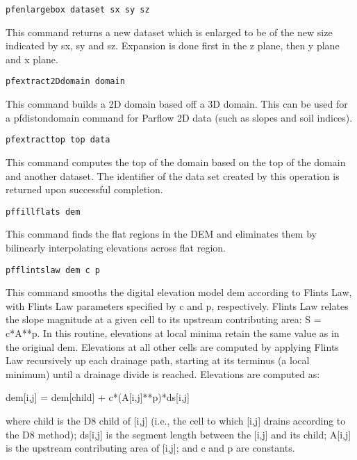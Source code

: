 \begin{description}
\item{\begin{verbatim}pfenlargebox dataset sx sy sz\end{verbatim}}
This command returns a new dataset which is enlarged to be of the
new size indicated by sx, sy and sz. Expansion is done first in the
z plane, then y plane and x plane.

\item{\begin{verbatim}pfextract2Ddomain domain\end{verbatim}} This
 command builds a 2D domain based off a 3D domain.  This can be used
 for a pfdistondomain command for Parflow 2D data (such as slopes and
 soil indices).

\item{\begin{verbatim}pfextracttop top data\end{verbatim}}
This command computes the top of the domain based on the top of the
 domain and another dataset.  The identifier of the data set created
 by this operation is returned upon successful completion.

\item{\begin{verbatim}pffillflats dem\end{verbatim}}
This command finds the flat regions in the DEM and eliminates them by
bilinearly interpolating elevations across flat region.

\item{\begin{verbatim}pfflintslaw dem c p\end{verbatim}}
This command smooths the digital elevation model dem according to Flints Law, with
Flints Law parameters specified by c and p, respectively. Flints Law relates the
slope magnitude at a given cell to its upstream contributing area: S = c*A**p. In
this routine, elevations at local minima retain the same value as in the original
dem. Elevations at all other cells are computed by applying Flints Law recursively
up each drainage path, starting at its terminus (a local minimum) until a drainage
divide is reached. Elevations are computed as:

dem[i,j] = dem[child] + c*(A[i,j]**p)*ds[i,j]

where child is the D8 child of [i,j] (i.e., the cell to which [i,j] drains according
to the D8 method); ds[i,j] is the segment length between the [i,j] and its child;
A[i,j] is the upstream contributing area of [i,j]; and c and p are constants.



\end{description}
